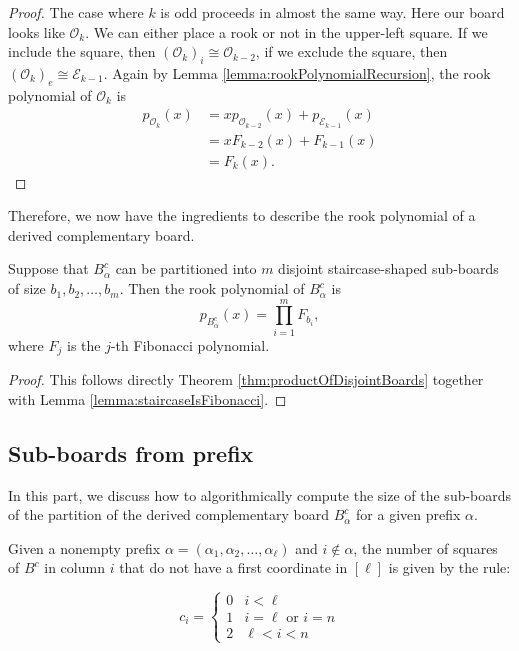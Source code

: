 \begin{proof}
  The case where $k$ is odd proceeds in almost the same way.
  Here our board looks like $\mathcal{O}_{k}$.
  We can either place a rook or not in the upper-left square.
  If we include the square, then $(\mathcal{O}_{k})_i \cong \mathcal{O}_{k-2}$,
  if we exclude the square, then $(\mathcal{O}_{k})_e \cong \mathcal{E}_{k-1}$.
  Again by Lemma \ref{lemma:rookPolynomialRecursion}, the rook polynomial
  of $\mathcal{O}_{k}$ is
  \begin{align}
    p_{\mathcal{O}_{k}}(x)
    &= xp_{\mathcal{O}_{k-2}}(x) + p_{\mathcal{E}_{k-1}}(x) \\
    &= xF_{k-2}(x) + F_{k-1}(x) \\
    &= F_{k}(x).
  \end{align}
\end{proof}

Therefore, we now have the ingredients to describe the rook polynomial of
a derived complementary board.

\begin{corollary}
  Suppose that $B_\alpha^c$ can be partitioned into $m$ disjoint
  staircase-shaped sub-boards of size $b_1, b_2, \dots, b_m$.
  Then the rook polynomial of
  $B_\alpha^c$ is \begin{equation}
    p_{B_\alpha^c}(x) = \prod_{i=1}^m F_{b_i},
  \end{equation} where $F_j$ is the $j$-th Fibonacci polynomial.
  \label{cor:derivedComplementaryRookPolynomial}
\end{corollary}
\begin{proof}
  This follows directly Theorem \ref{thm:productOfDisjointBoards} together
  with Lemma \ref{lemma:staircaseIsFibonacci}.
\end{proof}

\subsection{Sub-boards from prefix}

In this part, we discuss how to algorithmically compute the size of the
sub-boards of the partition of the derived complementary board $B_\alpha^c$
for a given prefix $\alpha$.

\begin{lemma}
  Given a nonempty prefix $\alpha = (\alpha_1, \alpha_2, \dots, \alpha_\ell)$
  and $i \not\in \alpha$,
  the number of squares of $B^c$ in column $i$ that do not have
  a first coordinate in $[\ell]$
  is given by the rule:
  \begin{singlespace}
  \begin{equation}
    c_i = \begin{cases}
      0 & i < \ell \\
      1 & i = \ell \text{ or } i = n \\
      2 & \ell < i < n
    \end{cases}
  \end{equation}
  \end{singlespace}
\end{lemma}

